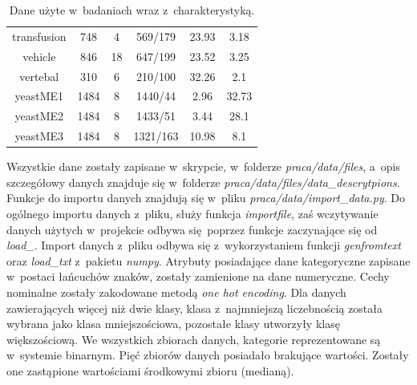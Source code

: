 \begin{table}[H]
\begin{center}
{\begin{tabular}{|c|c|c|c|c|c|}
				transfusion&748&4&569/179&23.93&3.18\\%
				vehicle&846&18&647/199&23.52&3.25\\%
				vertebal&310&6&210/100&32.26&2.1\\%
				yeastME1&1484&8&1440/44&2.96&32.73\\%
				yeastME2&1484&8&1433/51&3.44&28.1\\%
				yeastME3&1484&8&1321/163&10.98&8.1\\%
				\hline%
			\end{tabular}}
			\caption{Dane użyte w~badaniach wraz z~charakterystyką.}
			\label{danebadania}
		\end{center}
	\end{table}
Wszystkie dane zostały zapisane w~skrypcie, w~folderze \textit{praca/data/files}, a~opis szczegółowy danych znajduje się w~folderze \textit{praca/data/files/data\_descrytpions}. Funkcje do importu danych znajdują się w~pliku \textit{praca/data/import\_data.py}. Do ogólnego importu danych z~pliku, służy funkcja \textit{importfile}, zaś wczytywanie danych użytych w~projekcie odbywa się poprzez funkcje zaczynające się od \textit{load\_}. Import danych z~pliku odbywa się z~wykorzystaniem funkcji \textit{genfromtext} oraz \textit{load\_txt} z~pakietu \textit{numpy}. Atrybuty posiadające dane kategoryczne zapisane w~postaci łańcuchów znaków, zostały zamienione na dane numeryczne. Cechy nominalne zostały zakodowane metodą \textit{one hot encoding}. Dla danych zawierających więcej niż dwie klasy, klasa z~najmniejszą liczebnością została wybrana jako klasa mniejszościowa, pozostałe klasy utworzyły klasę większościową. We wszystkich zbiorach danych, kategorie reprezentowane są w~systemie binarnym. Pięć zbiorów danych posiadało brakujące wartości. Zostały one zastąpione wartościami środkowymi zbioru (medianą).

